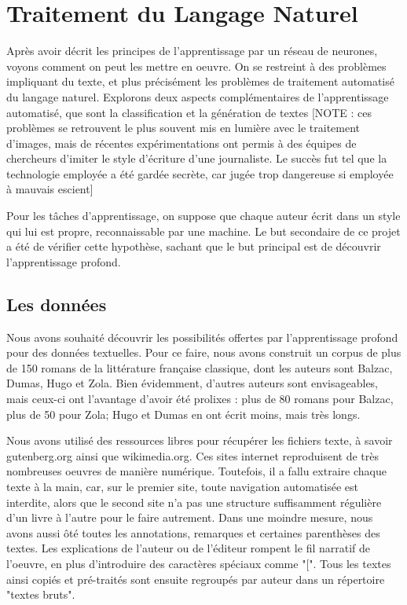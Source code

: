 \chapter{Traitement du Langage Naturel}

Après avoir décrit les principes de l'apprentissage par un réseau de neurones, voyons comment on peut les mettre en oeuvre. On se restreint à des problèmes impliquant du texte, et plus précisément les problèmes de traitement automatisé du langage naturel. Explorons deux aspects complémentaires de l'apprentissage automatisé, que sont la classification et la génération de textes [NOTE : ces problèmes se retrouvent le plus souvent mis en lumière avec le traitement d'images, mais de récentes expérimentations ont permis à des équipes de chercheurs d'imiter le style d'écriture d'une journaliste. Le succès fut tel que la technologie employée a été gardée secrète, car jugée trop dangereuse si employée à mauvais escient]

Pour les tâches d'apprentissage, on suppose que chaque auteur écrit dans un style qui lui est propre, reconnaissable par une machine. Le but secondaire de ce projet a été de vérifier cette hypothèse, sachant que le but principal est de découvrir l'apprentissage profond.

\section{Les données}
Nous avons souhaité découvrir les possibilités offertes par l'apprentissage profond pour des données textuelles. Pour ce faire, nous avons construit un corpus de plus de 150 romans de la littérature française classique, dont les auteurs sont Balzac, Dumas, Hugo et Zola. Bien évidemment, d'autres auteurs sont envisageables, mais ceux-ci ont l'avantage d'avoir été prolixes : plus de 80 romans pour Balzac, plus de 50 pour Zola; Hugo et Dumas en ont écrit moins, mais très longs.

Nous avons utilisé des ressources libres pour récupérer les fichiers texte, à savoir gutenberg.org ainsi que wikimedia.org. Ces sites internet reproduisent de très nombreuses oeuvres de manière numérique. Toutefois, il a fallu extraire chaque texte à la main, car, sur le premier site, toute navigation automatisée est interdite, alors que le second site n'a pas une structure suffisamment régulière d'un livre à l'autre pour le faire autrement. Dans une moindre mesure, nous avons aussi ôté toutes les annotations, remarques et certaines parenthèses des textes. Les explications de l'auteur ou de l'éditeur rompent le fil narratif de l'oeuvre, en plus d'introduire des caractères spéciaux comme "[". Tous les textes ainsi copiés et pré-traités sont ensuite regroupés par auteur dans un répertoire "textes bruts".

